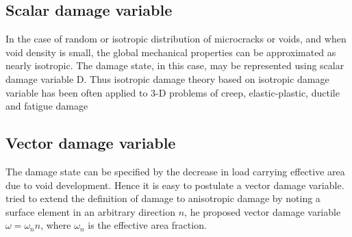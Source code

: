 \documentclass[12pt,a4paper,twoside,openright]{report}
\begin{document}
\subsection{Scalar damage variable}
\indent\indent\indent In the case of random or isotropic distribution of microcracks or voids, and when void density is small, the global mechanical properties can be approximated as nearly isotropic. The damage state, in this case, may be represented using scalar damage variable D. Thus isotropic damage theory based on isotropic damage variable has been often applied to 3-D problems of creep, elastic-plastic, ductile and fatigue damage \citep{lemaitre2012course}
\subsection{Vector damage variable}
\indent\indent\indent The damage state can be specified by the decrease in load carrying effective area due to void development. Hence it is easy to postulate a vector damage variable.  \citep{kachanov1986introduction} tried to extend the definition of damage to anisotropic damage by noting a surface element in an arbitrary direction $n$, he proposed vector damage variable $ \omega = \omega_{n}n$, where $\omega_{n}$ is the effective area fraction. 
\end{document}

